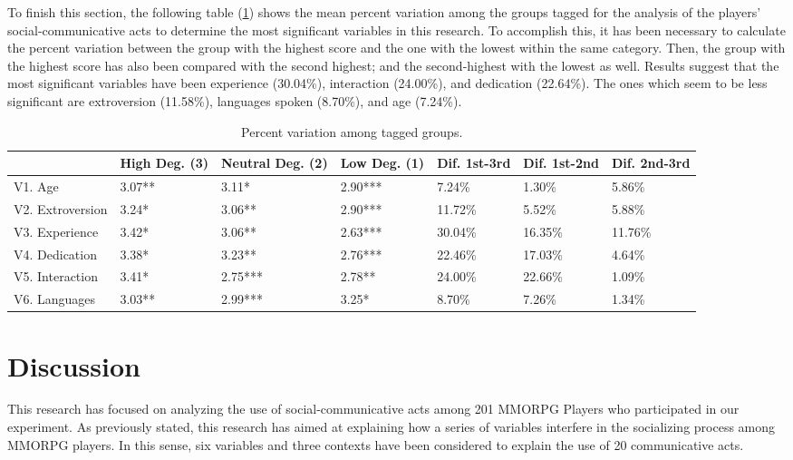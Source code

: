 \documentclass[english]{textolivre}
\begin{document}
\begin{enumerate}
\end{enumerate}

To finish this section, the following table (\ref{figure8}) shows the mean percent variation among the groups tagged for the analysis of the players' social-communicative acts to determine the most significant variables in this research. To accomplish this, it has been necessary to calculate the percent variation between the group with the highest score and the one with the lowest within the same category. Then, the group with the highest score has also been compared with the second highest; and the second-highest with the lowest as well. Results suggest that the most significant variables have been experience (30.04\%), interaction (24.00\%), and dedication (22.64\%). The ones which seem to be less significant are extroversion (11.58\%), languages spoken (8.70\%), and age (7.24\%). 

\begin{table}[htpb]
\caption{Percent variation among tagged groups.}
\label{figure8}
\centering
\begin{tabular}{p{}p{}p{}p{}p{}p{}p{}}
\toprule
& High Deg. (3) & Neutral Deg. (2) & Low Deg. (1) & Dif. 1st-3rd & Dif. 1st-2nd & Dif. 2nd-3rd
\\ 
\midrule
V1. Age & 3.07** & 3.11* & 2.90*** & 7.24\% & 1.30\% & 5.86\%
\\
V2. Extroversion & 3.24* & 3.06** & 2.90*** & 11.72\% & 5.52\% & 5.88\% 
\\
V3. Experience & 3.42* & 3.06** & 2.63*** & 30.04\% & 16.35\% & 11.76\%
\\
V4. Dedication & 3.38* & 3.23** & 2.76*** & 22.46\% & 17.03\% & 4.64\%
\\
V5. Interaction & 3.41* & 2.75*** & 2.78** & 24.00\% & 22.66\% & 1.09\%
\\
V6. Languages & 3.03** & 2.99*** & 3.25* & 8.70\% & 7.26\% & 1.34\%
\\
\bottomrule
\end{tabular}
\vspace{1ex}
\end{table}


\section{Discussion}
This research has focused on analyzing the use of social-communicative acts among 201 MMORPG Players who participated in our experiment. As previously stated, this research has aimed at explaining how a series of variables interfere in the socializing process among MMORPG players. In this sense, six variables and three contexts have been considered to explain the use of 20 communicative acts.
\end{document}
